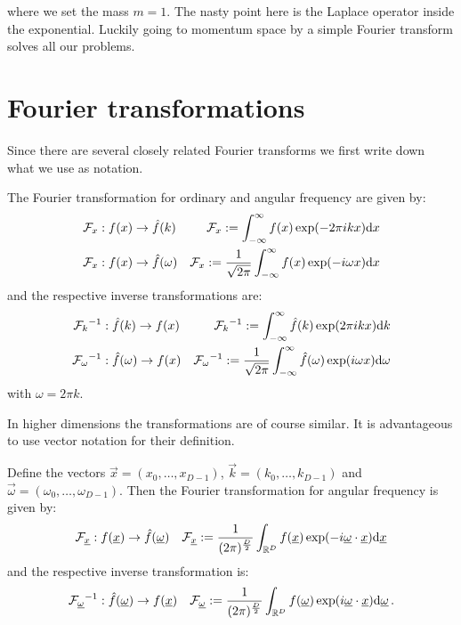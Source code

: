 where we set the mass $m=1$. The nasty point here is the Laplace operator
inside the exponential. Luckily going to momentum space by a simple
Fourier transform solves all our problems.


\section{Fourier transformations}


Since there are several closely related Fourier transforms we first write
down what we use as notation.

\begin{definition}
  The Fourier transformation for ordinary and angular frequency are given by:
  \begin{align*}
    \mathcal{F}_x & : f(x) \rightarrow \hat{f}(k)
    & \mathcal{F}_x := \int_{-\infty}^{\infty} f(x) \exp(- 2\pi i k x) \mathrm{d}x \\
    \mathcal{F}_x & : f(x) \rightarrow \hat{f}(\omega)
    & \mathcal{F}_x := \frac{1}{\sqrt{2\pi}} \int_{-\infty}^{\infty} f(x) \exp(-i \omega x) \mathrm{d}x
  \end{align*}
  and the respective inverse transformations are:
  \begin{align*}
    \mathcal{F}_k{}^{-1}      & : \hat{f}(k)      \rightarrow f(x)
    & \mathcal{F}_k{}^{-1} := \int_{-\infty}^{\infty} \hat{f}(k) \exp(2\pi i k x) \mathrm{d}k \\
    \mathcal{F}_\omega{}^{-1} & : \hat{f}(\omega) \rightarrow f(x)
    & \mathcal{F}_\omega{}^{-1} := \frac{1}{\sqrt{2\pi}} \int_{-\infty}^{\infty} \hat{f}(\omega) \exp(i \omega x) \mathrm{d}\omega
  \end{align*}
  with $\omega = 2\pi k$.
\end{definition}

In higher dimensions the transformations are of course similar. It is advantageous
to use vector notation for their definition.

\begin{definition}
  Define the vectors $\vec{x} = (x_0, \ldots, x_{D-1})$, $\vec{k} = (k_0, \ldots, k_{D-1})$
  and $\vec{\omega} = (\omega_0, \ldots, \omega_{D-1})$. Then the Fourier
  transformation for angular frequency is given by:
  \begin{align*}
    \mathcal{F}_{\underline{x}} & : f(\underline{x}) \rightarrow \hat{f}(\underline{\omega})
    & \mathcal{F}_{\underline{x}} := \frac{1}{(2\pi)^{\frac{D}{2}}}
      \int_{\mathbb{R}^D} f(\underline{x}) \exp(-i \underline{\omega}\cdot\underline{x}) \mathrm{d}\underline{x}
  \end{align*}
  and the respective inverse transformation is:
  \begin{align*}
    \mathcal{F}_{\underline{\omega}}{}^{-1} & : \hat{f}(\underline{\omega}) \rightarrow f(\underline{x})
    & \mathcal{F}_{\underline{\omega}} := \frac{1}{(2\pi)^{\frac{D}{2}}}
      \int_{\mathbb{R}^D} f(\underline{\omega}) \exp(i \underline{\omega}\cdot\underline{x}) \mathrm{d}\underline{\omega} \,.
  \end{align*}
\end{definition}

